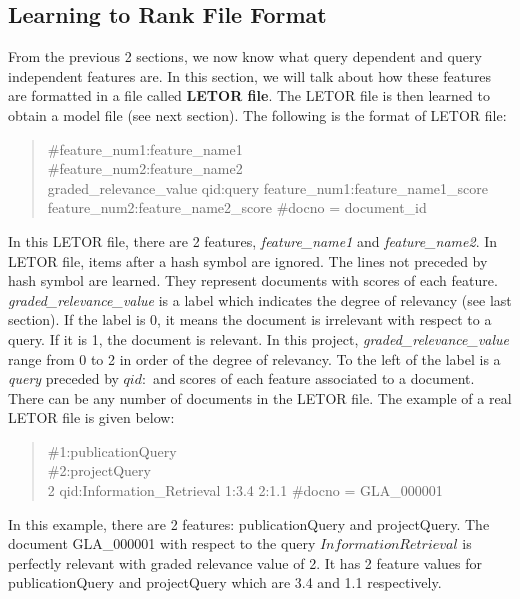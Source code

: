 \subsection{Learning to Rank File Format}\label{sec:letorFile}
From the previous 2 sections, we now know what query dependent and query independent features are. In this section, we will talk about how these features
are formatted in a file called \textbf{LETOR file}. The LETOR file is then learned to obtain a model file (see next section).
The following is the format of LETOR file:

\begin{quotation}
\noindent\#feature\_num1:feature\_name1 \\
\#feature\_num2:feature\_name2 \\
graded\_relevance\_value qid:query feature\_num1:feature\_name1\_score feature\_num2:feature\_name2\_score \#docno = document\_id
\end{quotation}

In this LETOR file, there are 2 features, \textit{feature\_name1} and \textit{feature\_name2}. In LETOR file, items after a hash symbol are ignored.
The lines not preceded by hash symbol are learned. They represent documents with scores
of each feature. \textit{graded\_relevance\_value} is a label which indicates the degree of relevancy (see last section).
If the label is 0, it means the document is irrelevant with respect to a query. If it is 1, the document is relevant. 
In this project, \textit{graded\_relevance\_value} range from 0 to 2 in order of 
the degree of relevancy. To the left of the label is a \textit{query} preceded by \textit{$qid:$} and scores of each feature associated to a document.
There can be any number of documents in the LETOR file. The example of a real LETOR file is given below:

\begin{quotation}
\noindent\#1:publicationQuery \\
\#2:projectQuery \\
2 qid:Information\_Retrieval 1:3.4 2:1.1 \#docno = GLA\_000001
\end{quotation}

In this example, there are 2 features: publicationQuery and projectQuery. The document GLA\_000001 with respect to the query $Information Retrieval$
is perfectly relevant with graded relevance value of 2. It has 2 feature values for publicationQuery and projectQuery which are 3.4 and 1.1 respectively.


